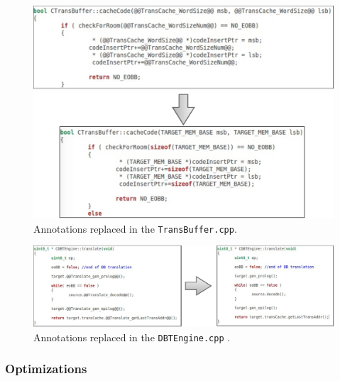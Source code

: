 \begin{figure}[H]
\centerline{
\includegraphics[scale=0.5]{images/annotation_test2}
}
\caption{Annotations replaced in the \texttt{TransBuffer.cpp}.}
\label{fig:annotation_test2}
\end{figure}

\begin{figure}[H]
\centerline{
\includegraphics[scale=0.5]{images/annotation_test3}
}
\caption{Annotations replaced in the \texttt{DBTEngine.cpp} .}
\label{fig:annotation_test3}
\end{figure}

\subsubsection{Optimizations}

